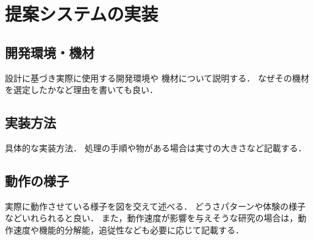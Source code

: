 \chapter{提案システムの実装}
\label{chap:implementation}

\section{開発環境・機材}
設計に基づき実際に使用する開発環境や
機材について説明する．
なぜその機材を選定したかなど理由を書いても良い．

\section{実装方法}
具体的な実装方法．
処理の手順や物がある場合は実寸の大きさなど記載する．



\section{動作の様子}
実際に動作させている様子を図を交えて述べる．
どうさパターンや体験の様子などいれられると良い．
また，動作速度が影響を与えそうな研究の場合は，動作速度や機能的分解能，追従性なども必要に応じて記載する．

